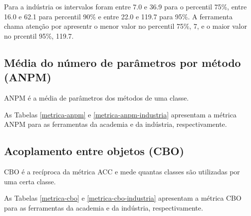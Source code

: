 
Para a indústria os intervalos foram entre 7.0 e 36.9 para o percentil 75\%,
entre 16.0 e 62.1 para percentil 90\% e entre 22.0 e 119.7 para 95\%. A
ferramenta chama atenção por apresentr o menor valor no percentil 75\%, 7, e o
maior valor no prcentil 95\%, 119.7.

\subsection{Média do número de parâmetros por método (ANPM)}

ANPM é a média de parâmetros dos métodos de uma classe.

As Tabelas \ref{metrica-anpm} e \ref{metrica-anpm-industria} apresentam a
métrica ANPM para as ferramentas da academia e da indústria, respectivamente.



\subsection{Acoplamento entre objetos (CBO)}

CBO é a recíproca da métrica ACC e mede quantas classes são utilizadas por uma
certa classe.

As Tabelas \ref{metrica-cbo} e \ref{metrica-cbo-industria} apresentam a
métrica CBO para as ferramentas da academia e da indústria, respectivamente.

